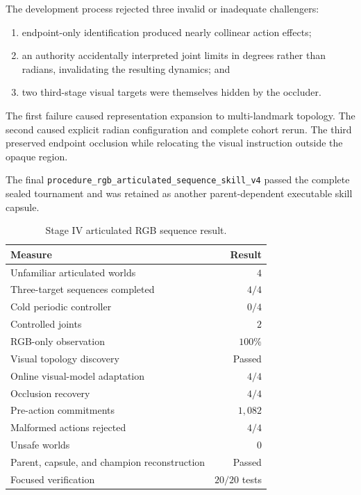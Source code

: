 The development process rejected three invalid or inadequate challengers:
\begin{enumerate}[leftmargin=*]
  \item endpoint-only identification produced nearly collinear action effects;
  \item an authority accidentally interpreted joint limits in degrees rather
        than radians, invalidating the resulting dynamics; and
  \item two third-stage visual targets were themselves hidden by the occluder.
\end{enumerate}
The first failure caused representation expansion to multi-landmark topology.
The second caused explicit radian configuration and complete cohort rerun.  The
third preserved endpoint occlusion while relocating the visual instruction
outside the opaque region.

The final
\texttt{procedure\_rgb\_articulated\_sequence\_skill\_v4} passed the complete
sealed tournament and was retained as another parent-dependent executable skill
capsule.

\begin{table}[htbp]
\centering
\caption{Stage IV articulated RGB sequence result.}
\label{tab:rgb-articulated-result}
\begin{tabular}{@{}lr@{}}
\toprule
\textbf{Measure} & \textbf{Result} \\
\midrule
Unfamiliar articulated worlds & $4$ \\
Three-target sequences completed & $4/4$ \\
Cold periodic controller & $0/4$ \\
Controlled joints & $2$ \\
RGB-only observation & $100\%$ \\
Visual topology discovery & Passed \\
Online visual-model adaptation & $4/4$ \\
Occlusion recovery & $4/4$ \\
Pre-action commitments & $1{,}082$ \\
Malformed actions rejected & $4/4$ \\
Unsafe worlds & $0$ \\
Parent, capsule, and champion reconstruction & Passed \\
Focused verification & $20/20$ tests \\
\bottomrule
\end{tabular}
\end{table}

